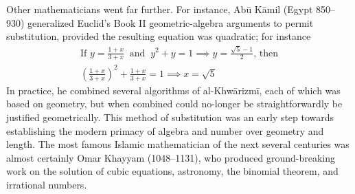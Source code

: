 

Other mathematicians went far further. For instance, Abū Kāmil (Egypt 850--930) generalized Euclid's Book II geometric-algebra arguments to permit substitution, provided the resulting equation was quadratic; for instance
\begin{gather*}
	\text{If }y=\frac{1+x}{3+x}\ \text{ and }\ y^2+y=1\implies y=\frac{\sqrt 5 -1}2\text{, then}\\[2pt]
	\left(\frac{1+x}{3+x}\right)^2+\frac{1+x}{3+x}=1\implies x=\sqrt 5
\end{gather*}
In practice, he combined several algorithms of al-Khwārizmī, each of which was based on geometry, but when combined could no-longer be straightforwardly be justified geometrically. This method of substitution was an early step towards establishing the modern primacy of algebra and number over geometry and length.\smallbreak
The most famous Islamic mathematician of the next several centuries was almost certainly Omar Khayyam (1048--1131), who produced ground-breaking work on the solution of cubic equations, astronomy, the binomial theorem, and irrational numbers. %


